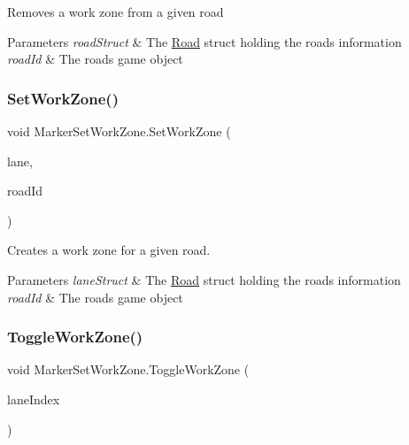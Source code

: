 Removes a work zone from a given road 


\begin{DoxyParams}{Parameters}
{\em road\+Struct} & The \mbox{\hyperlink{struct_road}{Road}} struct holding the road\textquotesingle{}s information\\
\hline
{\em road\+Id} & The road\textquotesingle{}s game object\\
\hline
\end{DoxyParams}
\mbox{\label{class_marker_set_work_zone_ab68a05bfd9dfa2a2de396731e88dba4d}} 
\subsubsection{\texorpdfstring{SetWorkZone()}{SetWorkZone()}}
{\footnotesize\ttfamily void Marker\+Set\+Work\+Zone.\+Set\+Work\+Zone (\begin{DoxyParamCaption}\item[{Game\+Object}]{lane,  }\item[{string}]{road\+Id }\end{DoxyParamCaption})}



Creates a work zone for a given road. 


\begin{DoxyParams}{Parameters}
{\em lane\+Struct} & The \mbox{\hyperlink{struct_road}{Road}} struct holding the road\textquotesingle{}s information\\
\hline
{\em road\+Id} & The road\textquotesingle{}s game object\\
\hline
\end{DoxyParams}
\mbox{\label{class_marker_set_work_zone_a97b266550460ab718ded641db864704c}} 
\subsubsection{\texorpdfstring{ToggleWorkZone()}{ToggleWorkZone()}}
{\footnotesize\ttfamily void Marker\+Set\+Work\+Zone.\+Toggle\+Work\+Zone (\begin{DoxyParamCaption}\item[{int}]{lane\+Index }\end{DoxyParamCaption})}



